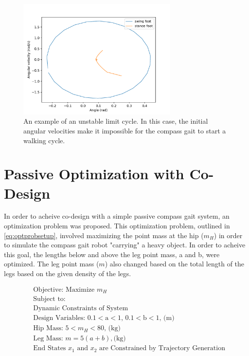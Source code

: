 \documentclass{./springer/svjour3}
\begin{document}
\begin{figure}[!h]
\centering
\includegraphics[width=8cm]{./figures/unstable_onecycle.pdf}
\caption{An example of an unstable limit cycle. In this case, the initial angular velocities make it impossible for the compass gait to start a walking cycle.}
\label{fig:unstable_onecycle}
\end{figure}

\clearpage

\section{Passive Optimization with Co-Design}

In order to acheive co-design with a simple passive compass gait system, an optimization problem was proposed.
This optimization problem, outlined in  \ref{eq:optprobsetup}, involved maximizing the point mass at the hip ($m_H$) in order to simulate the
compass gait robot "carrying" a heavy object. In order to acheive this goal, the lengths below and above the leg point mass, a and b, were optimized.
The leg point mass ($m$) also changed based on the total length of the legs based on the given density of the legs.

\begin{equation}
\begin{aligned}
&\text{Objective: Maximize $m_H$}\\
&\text{Subject to:}\\
&\text{Dynamic Constraints of System}\\
&\text{Design Variables: 0.1$<$a$<$1, 0.1$<$b$<$1, (m)}\\
&\text{Hip Mass: 5$<$$m_H$$<$80, (kg)}\\
&\text{Leg Mass: } m = 5(a+b), \text{(kg)}\\
&\text{End States $x_1$ and $x_2$ are Constrained by Trajectory Generation}
\end{aligned}
\label{eq:optprobsetup}
\end{equation}
\end{document}

